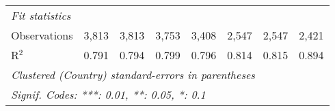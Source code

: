 \begin{tabular}{lccccccc}
   \midrule \emph{Fit statistics}\\
   Observations                                                      & 3,813         & 3,813         & 3,753         & 3,408         & 2,547         & 2,547         & 2,421\\  
   R$^2$                                                             & 0.791         & 0.794         & 0.799         & 0.796         & 0.814         & 0.815         & 0.894\\  
   \midrule
   \multicolumn{8}{l}{\emph{Clustered (Country) standard-errors in parentheses}}\\
   \multicolumn{8}{l}{\emph{Signif. Codes: ***: 0.01, **: 0.05, *: 0.1}}\\
\end{tabular}
\par\endgroup


